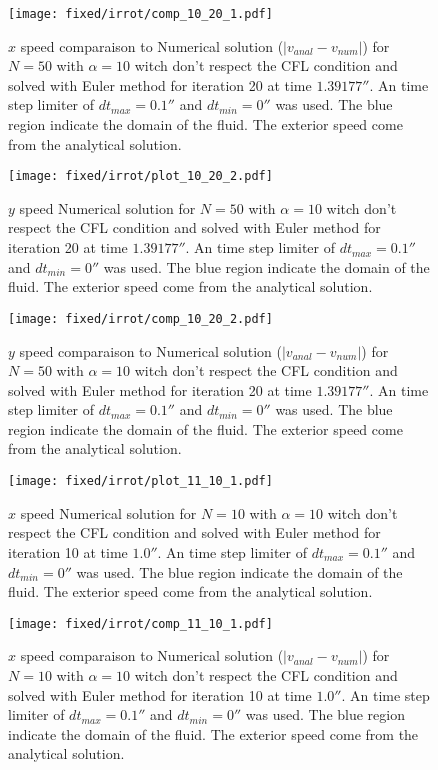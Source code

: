 \begin{figure}
\texttt{[image: fixed/irrot/comp\_10\_20\_1.pdf]}
\caption{$x$ speed comparaison to Numerical solution ($|v_{anal}-v_{num}|$) for $N=50$ with $\alpha=10$ witch don't respect the CFL condition and solved with Euler method
for iteration 20 at time $\unit{1.39177}{\second}$.
An time step limiter of $dt_{max}=\unit{0.1}{\second}$ and $dt_{min}=\unit{0}{\second}$ was used.
The blue region indicate the domain of the fluid. The exterior speed come from the analytical solution.
\label{fix:comp_10_20_1}
}
\end{figure}

\begin{figure}
\texttt{[image: fixed/irrot/plot\_10\_20\_2.pdf]}
\caption{$y$ speed Numerical solution for $N=50$ with $\alpha=10$ witch don't respect the CFL condition and solved with Euler method
for iteration 20 at time $\unit{1.39177}{\second}$.
An time step limiter of $dt_{max}=\unit{0.1}{\second}$ and $dt_{min}=\unit{0}{\second}$ was used.
The blue region indicate the domain of the fluid. The exterior speed come from the analytical solution.
\label{fix:plot_10_20_2}
}
\end{figure}

\begin{figure}
\texttt{[image: fixed/irrot/comp\_10\_20\_2.pdf]}
\caption{$y$ speed comparaison to Numerical solution ($|v_{anal}-v_{num}|$) for $N=50$ with $\alpha=10$ witch don't respect the CFL condition and solved with Euler method
for iteration 20 at time $\unit{1.39177}{\second}$.
An time step limiter of $dt_{max}=\unit{0.1}{\second}$ and $dt_{min}=\unit{0}{\second}$ was used.
The blue region indicate the domain of the fluid. The exterior speed come from the analytical solution.
\label{fix:comp_10_20_2}
}
\end{figure}

\begin{figure}
\texttt{[image: fixed/irrot/plot\_11\_10\_1.pdf]}
\caption{$x$ speed Numerical solution for $N=10$ with $\alpha=10$ witch don't respect the CFL condition and solved with Euler method
for iteration 10 at time $\unit{1.0}{\second}$.
An time step limiter of $dt_{max}=\unit{0.1}{\second}$ and $dt_{min}=\unit{0}{\second}$ was used.
The blue region indicate the domain of the fluid. The exterior speed come from the analytical solution.
\label{fix:plot_11_10_1}
}
\end{figure}

\begin{figure}
\texttt{[image: fixed/irrot/comp\_11\_10\_1.pdf]}
\caption{$x$ speed comparaison to Numerical solution ($|v_{anal}-v_{num}|$) for $N=10$ with $\alpha=10$ witch don't respect the CFL condition and solved with Euler method
for iteration 10 at time $\unit{1.0}{\second}$.
An time step limiter of $dt_{max}=\unit{0.1}{\second}$ and $dt_{min}=\unit{0}{\second}$ was used.
The blue region indicate the domain of the fluid. The exterior speed come from the analytical solution.
\label{fix:comp_11_10_1}
}
\end{figure}


